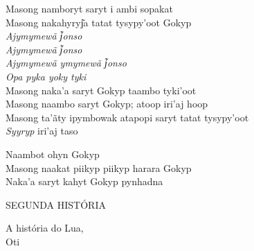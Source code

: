 \begin{linenumbers}\begingroup\raggedright
\noindent Masong namboryt saryt i ambi sopakat\\
Masong nakahyryj͂a tatat tysypy'oot Gokyp\\
\emph{Ajymymewã j͂onso}\\
\emph{Ajymymewã j͂onso}\\
\emph{Ajymymewã ymymewã j͂onso}\\
\emph{Opa pyka yoky tyki}\\
Masong naka'a saryt Gokyp taambo tyki'oot\\
Masong naambo saryt Gokyp; atoop iri'aj hoop\\
Masong ta'ãty ipymbowak atapopi saryt tatat tysypy'oot\\
\emph{Syyryp} iri'aj taso
\end{linenumbers}\endgroup

\bigskip

\begin{linenumbers}\begingroup\raggedright
\noindent Naambot ohyn Gokyp\\
Masong naakat piikyp piikyp harara Gokyp\\
Naka'a saryt kahyt Gokyp pynhadna
\end{linenumbers}\endgroup


\pagebreak
\thispagestyle{empty}
\mbox{}
\begin{center}
\vspace{4cm}
{\formularlight\small SEGUNDA HISTÓRIA}

\medskip

{\formular\huge A história do Lua,\\\vspace{0.2cm} Oti}
\end{center}
\pagebreak

